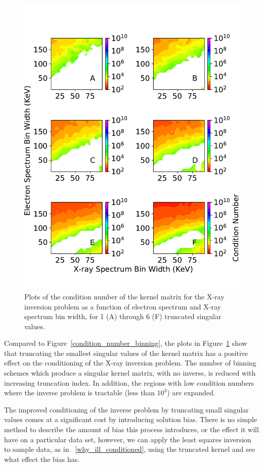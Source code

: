 \begin{figure}[p]
    \centering
    \includegraphics[width=.95\textwidth]{figures/chapter_4/condition_number_binning_tsvd/fig.pdf}
    \caption{Plots of the condition number of the kernel matrix for the X-ray inversion problem as a function of electron spectrum and X-ray spectrum bin width, for 1 (A) through 6 (F) truncated singular values.}
    \label{condition-number-binning-tsvd}
\end{figure}

Compared to Figure~\ref{condition_number_binning}, the plots in Figure~\ref{condition-number-binning-tsvd} show that truncating the smallest singular values of the kernel matrix has a positive effect on the conditioning of the X-ray inversion problem. The number of binning schemes which produce a singular kernel matrix, with no inverse, is reduced with increasing truncation index. In addition, the regions with low condition numbers where the inverse problem is tractable (less than $10^3$) are expanded. 

The improved conditioning of the inverse problem by truncating small singular values comes at a significant cost by introducing solution bias. There is no simple method to describe the amount of bias this process introduces, or the effect it will have on a particular data set, however, we can apply the least squares inversion to sample data, as in ~\ref{why_ill_conditioned}, using the truncated kernel and see what effect the bias has. 

